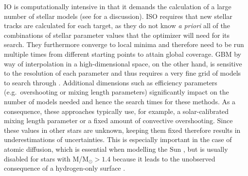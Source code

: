 \documentclass[twocolumn,twocolappendix]{aastex6}
\begin{document}
IO is computationally intensive in that it demands the calculation of a large number of stellar models (see \citealt{2009ApJ...699..373M} for a discussion).
ISO requires that new stellar tracks are calculated for each target, as they do not know \emph{a priori} all of the combinations of stellar parameter values that the optimizer will need for its search. They furthermore converge to local minima and therefore need to be run multiple times from different starting points to attain global coverage. %
GBM by way of interpolation in a high-dimensional space, on the other hand, is sensitive to the resolution of each parameter and thus requires a very fine grid of models to search through \citep[see e.g.][who use more than five million models that were varied in just four initial parameters]{2010ApJ...725.2176Q}. Additional dimensions such as efficiency parameters (e.g.\ overshooting or mixing length parameters) significantly impact on the number of models needed and hence the search times for these methods. As a consequence, these approaches typically use, for example, a solar-calibrated mixing length parameter or a fixed amount of convective overshooting. Since these values in other stars are unknown, keeping them fixed therefore results in underestimations of uncertainties. This is especially important in the case of atomic diffusion, which is essential when modelling the Sun \citep[see e.g.][]{1994MNRAS.269.1137B}, but is usually disabled for stars with M/M$_\odot > 1.4$ because it leads to the unobserved consequence of a hydrogen-only surface \citep{2002A&A...390..611M}. 
\end{document}
